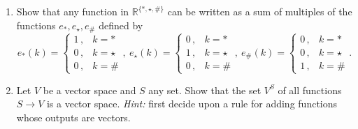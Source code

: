 \begin{enumerate}
\item Show that any function in $\mathbb{R}^{\{*,\star,\# \}}$ can be written as a sum of multiples of the functions $e_*,e_\star,e_\#$ defined by 
\[
   e_* (k)= \left\{\!\!
     \begin{array}{ll}
       1\, , &  k=*\\
       0\, , &  k=\star \\
       0\, , & k=\# 
     \end{array}
   \right. 
 ,~
   e_\star (k)=  \left\{\!\!
     \begin{array}{ll}
       0\, , &  k=*\\
       1\, , &  k=\star \\
       0\, , & k=\# 
     \end{array}
   \right. 
  ,~
   e_\# (k)=  \left\{\!\!
     \begin{array}{ll}
       0\, , &  k=*\\
       0\, , &  k=\star \\
       1\, , & k=\# 
     \end{array}
   \right.. \]

\item Let $V$ be a vector space and $S$ any set. Show that the set $V^S$ of all functions  $S \to V$ is a vector space.
{\itshape Hint:} first decide upon a rule for adding functions whose outputs are vectors.

\end{enumerate}

